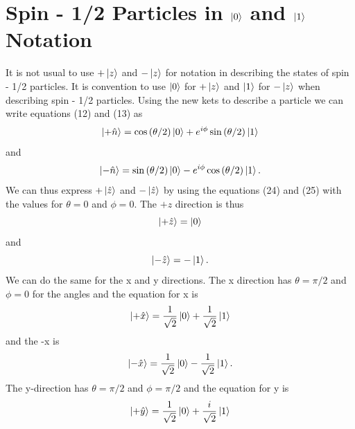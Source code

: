 \documentclass[twocolumn]{article}
\begin{document}
\section*{Spin - 1/2 Particles in $\ket{0}$ and $\ket{1}$ Notation}
It is not usual to use $+\ket{z}$ and $-\ket{z}$ for notation in describing the states of spin - 1/2 particles. It is convention to use $\ket{0}$ for $+\ket{z}$ and $\ket{1}$ for $-\ket{z}$ when describing spin - 1/2 particles. Using the new kets to describe a particle we can write equations (12) and (13) as
\begin{equation}
\ket{+\hat{n}}=\cos{(\theta/2)}\ket{0}+e^{i\phi}\sin{(\theta/2)}\ket{1}
\end{equation}
and
\begin{equation}
\ket{-\hat{n}}=\sin{(\theta/2)}\ket{0}-e^{i\phi}\cos{(\theta/2)}\ket{1}.
\end{equation}
We can thus express $+\ket{\hat{z}}$ and $-\ket{\hat{z}}$ by using the equations (24) and (25) with the values for $\theta=0$ and $\phi=0$. The $+z$ direction is thus
\begin{equation}
\ket{+\hat{z}}=\ket{0}
\end{equation}
and
\begin{equation}
\ket{-\hat{z}}=-\ket{1}.
\end{equation}
We can do the same for the x and y directions. The x direction has $\theta = \pi/2$ and $\phi=0$ for the angles and the equation for x is
\begin{equation}
\ket{+\hat{x}}=\frac{1}{\sqrt{2}}\ket{0}+\frac{1}{\sqrt{2}}\ket{1}
\end{equation}
and the -x is
\begin{equation}
\ket{-\hat{x}}=\frac{1}{\sqrt{2}}\ket{0}-\frac{1}{\sqrt{2}}\ket{1}.
\end{equation}
The y-direction has $\theta=\pi/2$ and $\phi=\pi/2$ and the equation for y is
\begin{equation}
\ket{+\hat{y}}=\frac{1}{\sqrt{2}}\ket{0}+\frac{i}{\sqrt{2}}\ket{1}
\end{equation}
\end{document}
